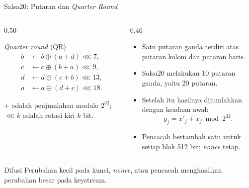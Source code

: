 \documentclass[aspectratio=169,11pt]{beamer}
\begin{document}
\begin{frame}{Salsa20: Putaran dan \textit{Quarter Round}}
    \footnotesize
    \begin{columns}[T,onlytextwidth]
        \begin{column}{0.50\textwidth}
            \begin{block}{\textit{Quarter round} (QR)}
                \begin{align*}
                    b&\leftarrow b\oplus(a+d)\lll 7,\\
                    c&\leftarrow c\oplus(b+a)\lll 9,\\
                    d&\leftarrow d\oplus(c+b)\lll 13,\\
                    a&\leftarrow a\oplus(d+c)\lll 18.
                \end{align*}
            \end{block}
            {\scriptsize $+$ adalah penjumlahan modulo $2^{32}$;
            $\lll k$ adalah rotasi kiri $k$ bit.}
        \end{column}
        \begin{column}{0.46\textwidth}
            \begin{itemize}
                \item Satu putaran ganda terdiri atas putaran kolom dan
                      putaran baris.
                \item Salsa20 melakukan 10 putaran ganda, yaitu 20 putaran.
                \item Setelah itu hasilnya dijumlahkan dengan keadaan awal:
                      \[
                          y_j=x'_j+x_j\bmod 2^{32}.
                      \]
                \item Pencacah bertambah satu untuk setiap blok 512 bit;
                      \textit{nonce} tetap.
            \end{itemize}
        \end{column}
    \end{columns}
    \vspace{0.1cm}
    \begin{block}{Difusi}
        Perubahan kecil pada kunci, \textit{nonce}, atau pencacah
        menghasilkan perubahan besar pada keystream.
    \end{block}
\end{frame}
\end{document}
